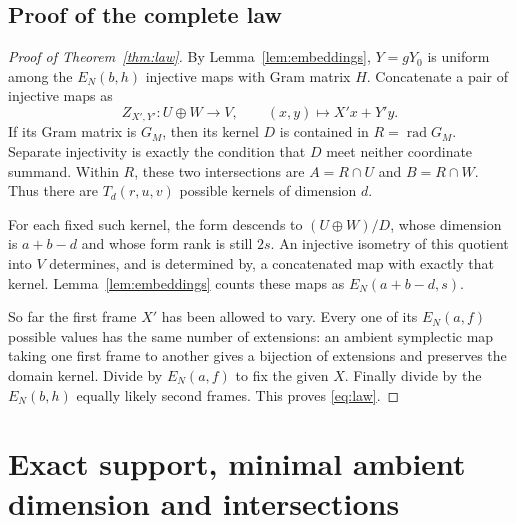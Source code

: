 \documentclass[11pt]{article}
\numberwithin{equation}{section}
\theoremstyle{definition}
\theoremstyle{remark}
\newcommand{\rad}{\operatorname{rad}}
\begin{document}
\subsection{Proof of the complete law}
\begin{proof}[Proof of Theorem~\ref{thm:law}]
By Lemma~\ref{lem:embeddings}, $Y=gY_0$ is uniform among the $E_N(b,h)$ injective maps with Gram matrix $H$. Concatenate a pair of injective maps as
\[
 Z_{X',Y'}:U\oplus W\longrightarrow V,\qquad (x,y)\longmapsto X'x+Y'y.
\]
If its Gram matrix is $G_M$, then its kernel $D$ is contained in $R=\rad G_M$. Separate injectivity is exactly the condition that $D$ meet neither coordinate summand. Within $R$, these two intersections are $A=R\cap U$ and $B=R\cap W$. Thus there are $T_d(r,u,v)$ possible kernels of dimension $d$.

For each fixed such kernel, the form descends to $(U\oplus W)/D$, whose dimension is $a+b-d$ and whose form rank is still $2s$. An injective isometry of this quotient into $V$ determines, and is determined by, a concatenated map with exactly that kernel. Lemma~\ref{lem:embeddings} counts these maps as $E_N(a+b-d,s)$.

So far the first frame $X'$ has been allowed to vary. Every one of its $E_N(a,f)$ possible values has the same number of extensions: an ambient symplectic map taking one first frame to another gives a bijection of extensions and preserves the domain kernel. Divide by $E_N(a,f)$ to fix the given $X$. Finally divide by the $E_N(b,h)$ equally likely second frames. This proves \eqref{eq:law}.
\end{proof}

\section{Exact support, minimal ambient dimension and intersections}
\label{sec:support}
\end{document}
